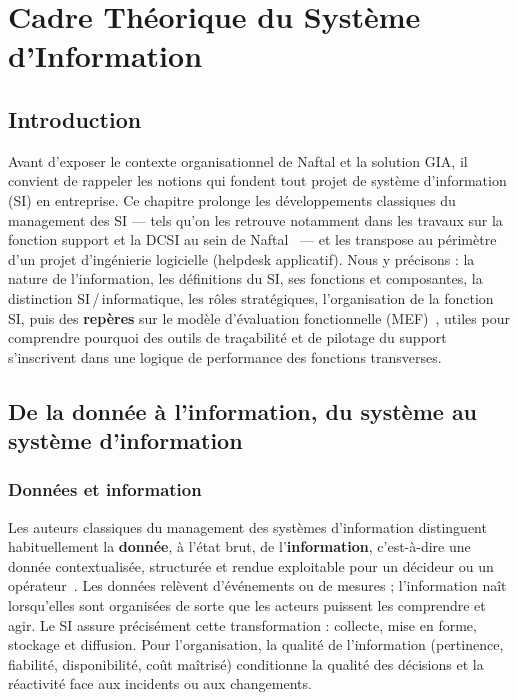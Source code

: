 \chapter{Cadre Théorique du Système d'Information}

\section{Introduction}
Avant d'exposer le contexte organisationnel de Naftal et la solution GIA, il convient de
rappeler les notions qui fondent tout projet de système d'information (SI) en entreprise.
Ce chapitre prolonge les développements classiques du management des SI — tels qu'on les
retrouve notamment dans les travaux sur la fonction support et la DCSI au sein de
Naftal~\cite{meghari2014,ssiouani2010} — et les transpose au périmètre d'un projet
d'ingénierie logicielle (helpdesk applicatif). Nous y précisons : la nature de l'information, les
définitions du SI, ses fonctions et composantes, la distinction SI\,/\,informatique, les rôles
stratégiques, l'organisation de la fonction SI, puis des \textbf{repères} sur le modèle
d'évaluation fonctionnelle (MEF)~\cite{autissier2008}, utiles pour comprendre pourquoi des
outils de traçabilité et de pilotage du support s'inscrivent dans une logique de performance des
fonctions transverses.

\section{De la donnée à l'information, du système au système d'information}

\subsection{Données et information}
Les auteurs classiques du management des systèmes d'information distinguent habituellement
la \textbf{donnée}, à l'état brut, de l'\textbf{information}, c'est-à-dire une donnée contextualisée,
structurée et rendue exploitable pour un décideur ou un opérateur~\cite{reix1995}. Les données
relèvent d'événements ou de mesures ; l'information naît lorsqu'elles sont organisées de sorte
que les acteurs puissent les comprendre et agir. Le SI assure précisément cette transformation :
collecte, mise en forme, stockage et diffusion. Pour l'organisation, la qualité de l'information
(pertinence, fiabilité, disponibilité, coût maîtrisé) conditionne la qualité des décisions et la
réactivité face aux incidents ou aux changements.

